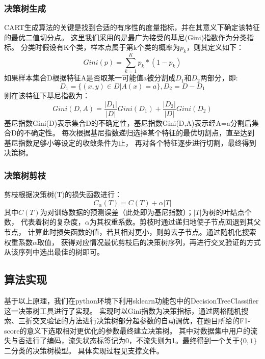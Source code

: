 \documentclass{ctexart}
\begin{document}
        \subsubsection{决策树生成}
        CART生成算法的关键是找到合适的有序性的度量指标，并在其意义下确定该特征的最优二值切分点。
        这里我们采用的是最广为接受的基尼(Gini)指数作为分类指标。
        分类时假设有K个类，样本点属于第k个类的概率为$p_k$，则其定义如下：
            \begin{equation}
               Gini(p)=\sum_{k = 1}^{K}p_k*(1-p_k)  
            \end{equation}
            如果样本集合D根据特征A是否取某一可能值a被分割成$D_1$和$D_2$两部分，即:
            \begin{equation}
             D_1 = \{ (x,y)\in D|A(x)=a\},D_2=D-D_1   
            \end{equation}   
            则在该特征下基尼指数为：
            \begin{equation}
                Gini(D,A)=\frac{|D_1|}{|D|}Gini(D_1)+ \frac{|D_2|}{|D|}Gini(D_2)
            \end{equation}
            基尼指数Gini(D)表示集合D的不确定性，基尼指数Gini(D,A)表示经A=a分割后集合D的不确定性。
            每次根据基尼指数递归选择某个特征的最优切割点，直至达到基尼指数足够小等设定的收敛条件为止，
            再对各个特征逐步进行切割，最终得到决策树。
        \subsubsection{决策树剪枝}
        剪枝根据决策树(T)的损失函数进行：
        \begin{equation}
            C_\alpha (T)=C(T)+ \alpha |T |
        \end{equation}
        其中$C(T)$为对训练数据的预测误差（此处即为基尼指数）；$|T|$为树的叶结点个数，
        代表着树的复杂度，$\alpha$为其权重系数。剪枝时通过递归地使子节点回退到其父节点，
        计算此时损失函数的值，若其相对更小，则剪去子节点。通过随机化搜索权重系数$\alpha $取值，
        获得对应情况最优剪枝后的决策树序列，再进行交叉验证的方式从该序列中选出最佳的树即可。
    \subsection{算法实现}
    基于以上原理，我们在python环境下利用sklearn功能包中的DecisionTreeClassifier这一决策树工具进行了实现。
    实现时以Gini指数为决策指标，通过网格随机搜索、三折交叉验证的方法进行决策树部分超参数的自动调优，在题目所给的F1-score的意义下选取相对更优化的参数最终建立决策树。
    其中对数据集中用户的流失与否进行了编码，流失状态标签记为0，不流失则为1。最终得到一个关于$\{0,1\}$二分类的决策树模型。
    具体实现过程见支撑文件。
\end{document}
